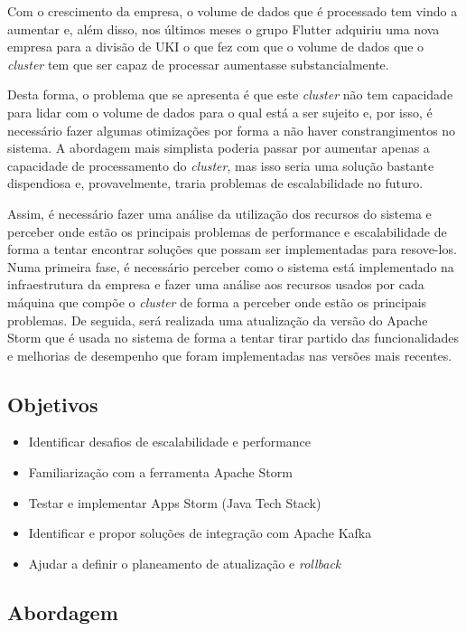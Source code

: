 Com o crescimento da empresa, o volume de dados que é processado tem vindo a aumentar e, além disso,
nos últimos meses o grupo Flutter adquiriu uma nova empresa para a divisão de \ac{UKI} o que fez 
com que o volume de dados que o \textit{cluster} tem que ser capaz de processar aumentasse 
substancialmente.

Desta forma, o problema que se apresenta é que este \textit{cluster} não tem capacidade para lidar
com o volume de dados para o qual está a ser sujeito e, por isso, é necessário fazer algumas
otimizações por forma a não haver constrangimentos no sistema. A abordagem mais simplista poderia 
passar por aumentar apenas a capacidade de processamento do \textit{cluster}, mas isso seria uma 
solução bastante dispendiosa e, provavelmente, traria problemas de escalabilidade no futuro.

Assim, é necessário fazer uma análise da utilização dos recursos do sistema e perceber onde estão 
os principais problemas de performance e escalabilidade de forma a tentar encontrar soluções que 
possam ser implementadas para resove-los. Numa primeira fase, é necessário perceber como o sistema 
está implementado na infraestrutura da empresa e fazer uma análise aos recursos usados por cada 
máquina que compõe o \textit{cluster} de forma a perceber onde estão os principais problemas. De 
seguida, será realizada uma atualização da versão do Apache Storm que é usada no sistema de forma 
a tentar tirar partido das funcionalidades e melhorias de desempenho que foram implementadas nas 
versões mais recentes.

\subsection{Objetivos}
\label{sec:1-obj}

\begin{itemize}
  \item Identificar desafios de escalabilidade e performance
  \item Familiarização com a ferramenta Apache Storm 
  \item Testar e implementar Apps Storm (Java Tech Stack) 
  \item Identificar e propor soluções de integração com Apache Kafka 
  \item Ajudar a definir o planeamento de atualização e \textit{rollback}
\end{itemize}

\subsection{Abordagem}

